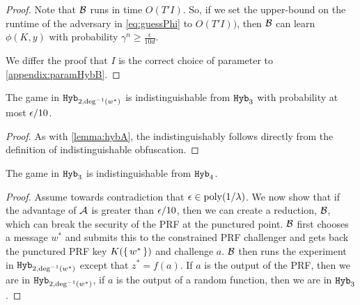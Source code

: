 \begin{lemma}
\begin{proof}
		Note that $\mathcal{B}$ runs in time $O(T' I)$. So, if we set the upper-bound on the runtime of the adversary in \cref{eq:guessPhi}
		to $O(T' I))$, then $\mathcal{B}$ can learn $\phi(K, y)$ with probability $\gamma^n \geq \frac{\epsilon}{10d}$.

		We differ the proof that $I$ is the correct choice of parameter to \cref{appendix:paramHybB}.
	\end{proof}
	
\end{lemma}

\begin{lemma}
	The game in $\texttt{Hyb}_{2, \deg^{-1}(w^*)}$ is indistinguishable from $\texttt{Hyb}_3$ with probability
	at most $\epsilon/10$.
	\begin{proof}
		As with \cref{lemma:hybA}, 
		the indistinguishably follows directly from the definition of indistinguishable obfuscation.
	\end{proof}
\end{lemma}

\begin{lemma}
	\label{lemma:hybC}
	The game in $\texttt{Hyb}_{3}$ is indistinguishable from $\texttt{Hyb}_4$.
	\begin{proof}
		Assume towards contradiction that $\epsilon \in \operatorname{poly}(1/\lambda)$.
		We now show that if the advantage of $\mathcal{A}$ is greater than $\epsilon/10$, then we can
		create a reduction, $\mathcal{B}$, which can break the security of the PRF at the punctured point.
		$\mathcal{B}$ first chooses a message $w^*$ and submits this to the constrained PRF challenger and gets back the punctured PRF key
		$K(\set{w^*})$ and challenge $a$. $\mathcal{B}$ then runs the experiment in $\texttt{Hyb}_{2, \deg^{-1}(w^*)}$
		except that $z^* = f(a)$. If $a$ is the output of the PRF, then we are in $\texttt{Hyb}_{2, \deg^{-1}(w^*)}$,
		if $a$ is the output of a random function, then we are in $\texttt{Hyb}_3$.
	\end{proof}
\end{lemma}

